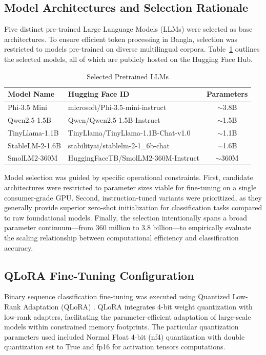 \documentclass[journal]{IEEEtran}
\begin{document}
\subsection{Model Architectures and Selection Rationale}

Five distinct pre-trained Large Language Models (LLMs) were selected as base architectures. To ensure efficient token processing in Bangla, selection was restricted to models pre-trained on diverse multilingual corpora. Table~\ref{tab:models} outlines the selected models, all of which are publicly hosted on the Hugging Face Hub.

\begin{table}[htbp]
\caption{Selected Pretrained LLMs}
\label{tab:models}
\centering
\begin{tabular}{llc}
\toprule
\textbf{Model Name} & \textbf{Hugging Face ID} & \textbf{Parameters} \\
\midrule
Phi-3.5 Mini & microsoft/Phi-3.5-mini-instruct & $\sim$3.8B \\
Qwen2.5-1.5B & Qwen/Qwen2.5-1.5B-Instruct & $\sim$1.5B \\
TinyLlama-1.1B & TinyLlama/TinyLlama-1.1B-Chat-v1.0 & $\sim$1.1B \\
StableLM-2-1.6B & stabilityai/stablelm-2-1\_6b-chat & $\sim$1.6B \\
SmolLM2-360M & HuggingFaceTB/SmolLM2-360M-Instruct & $\sim$360M \\
\bottomrule
\end{tabular}
\end{table}

Model selection was guided by specific operational constraints. First, candidate architectures were restricted to parameter sizes viable for fine-tuning on a single consumer-grade GPU. Second, instruction-tuned variants were prioritized, as they generally provide superior zero-shot initialization for classification tasks compared to raw foundational models. Finally, the selection intentionally spans a broad parameter continuum---from 360 million to 3.8 billion---to empirically evaluate the scaling relationship between computational efficiency and classification accuracy.

\subsection{QLoRA Fine-Tuning Configuration}

Binary sequence classification fine-tuning was executed using Quantized Low-Rank Adaptation (QLoRA) \cite{ref11}. QLoRA integrates 4-bit weight quantization with low-rank adapters, facilitating the parameter-efficient adaptation of large-scale models within constrained memory footprints. The
particular quantization parameters used included Normal Float 4-bit
(nf4) quantization with double quantization set to True and fp16 for
activation tensors computations.
\end{document}
